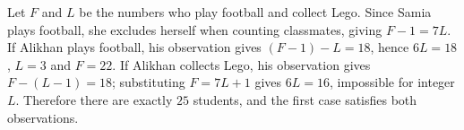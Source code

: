 Let $F$ and $L$ be the numbers who play football and collect Lego. Since Samia plays football, she excludes herself when counting classmates, giving $F-1=7L$.
If Alikhan plays football, his observation gives $(F-1)-L=18$, hence $6L=18$, $L=3$ and $F=22$. If Alikhan collects Lego, his observation gives $F-(L-1)=18$; substituting $F=7L+1$ gives $6L=16$, impossible for integer $L$. Therefore there are exactly $\boxed{25}$ students, and the first case satisfies both observations.
